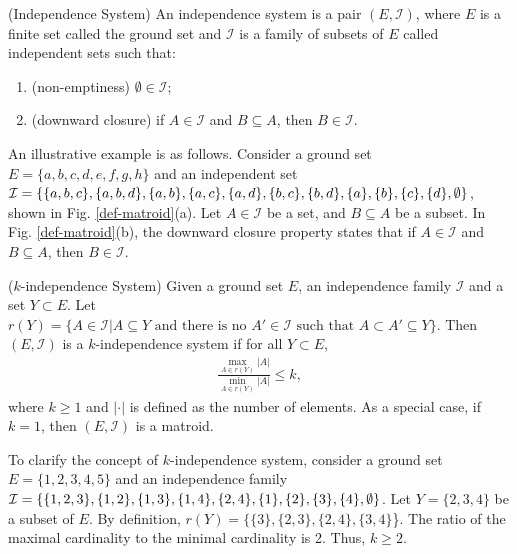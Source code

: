 \begin{definition} \label{def:independence-system} (Independence System) \cite{korte1978analysis}
An independence system is a pair $(E, \mathcal{I})$, where $E$ is a finite set called the ground set and $\mathcal{I}$ is a family of subsets of $E$ called independent sets such that:
\begin{enumerate}
    \item (non-emptiness) $\emptyset \in \mathcal{I}$;
    \item (downward closure) if $A\in \mathcal{I}$ and $B \subseteq A$, then $B \in \mathcal{I}$. \\
\end{enumerate}

An illustrative example is as follows.
Consider a ground set $E=\{a,b,c,d,e,f,g,h\}$ and an independent set $\mathcal{I}=\{\{a,b,c\}, \{a,b,d\}, \{a,b\}, \\ \{a,c\}, \{a,d\}, \{b,c\}, \{b,d\}, \{a\}, \{b\}, \{c\}, \{d\}, \emptyset \}$, shown in Fig. \ref{def-matroid}(a).
Let $A \in \mathcal{I}$ be a set, and $B \subseteq A$ be a subset. In Fig. \ref{def-matroid}(b), the downward closure property states that if $A\in \mathcal{I}$ and $B \subseteq A$, then $B \in \mathcal{I}$.\\
\end{definition}

\begin{definition} \label{def:k-independence-system} ($k$-independence System) \cite{korte1978analysis}
Given a ground set $E$, an independence family $\mathcal{I}$ and a set $Y\subset E$. Let $r(Y)=\{A \in \mathcal{I} | A\subseteq Y \text{ and there is no }A' \in \mathcal{I} \text{ such that } A\subset A' \subseteq Y \}$. Then $(E, \mathcal{I})$ is a $k$-independence system if for all $Y\subset E$,
\begin{align*}
    \frac{\max_{A\in r(Y)}|A|}{\min_{A\in r(Y)}|A|} \leq k,
\end{align*}
where $k\geq1$ and $|\cdot|$ is defined as the number of elements. As a special case, if $k=1$, then $(E, \mathcal{I})$ is a matroid. \\
\end{definition}

To clarify the concept of $k$-independence system, consider a ground set $E=\{1,2,3,4,5\}$ and an independence family $\mathcal{I}=\{\{1,2,3\},\{1,2\},\\ \{1,3\},\{1,4\},\{2,4\},\{1\},\{2\},\{3\}, \{4\},\emptyset \}$. Let $Y=\{2,3,4\}$ be a subset of $E$. By definition, $r(Y)=\{\{3\},\{2,3\},\{2,4\},\{3,4\}$\}. The ratio of the maximal cardinality to the minimal cardinality is 2. Thus, $k\geq2$.

